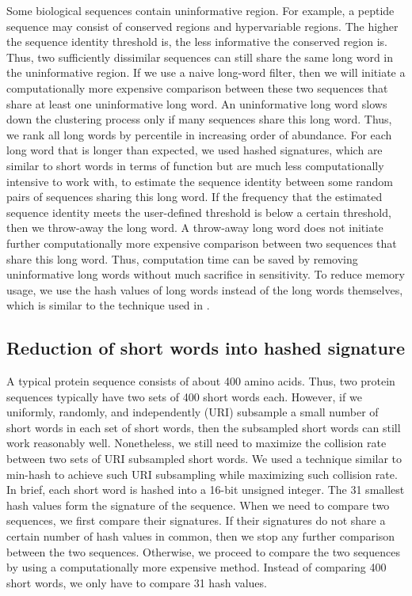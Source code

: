 \documentclass[11pt,letterpaper]{article}
\begin{document}
Some biological sequences contain uninformative region.
For example, a peptide sequence may consist of conserved regions and hypervariable regions.
The higher the sequence identity threshold is, the less informative the conserved region is.
Thus, two sufficiently dissimilar sequences can still share the same long word in the uninformative region.
If we use a naive long-word filter, then we will initiate a computationally more expensive comparison between these two sequences that share at least one uninformative long word.
An uninformative long word slows down the clustering process only if many sequences share this long word.
Thus, we rank all long words by percentile in increasing order of abundance.
For each long word that is longer than expected, we used hashed signatures, which are similar to short words in terms of function but are much less computationally intensive to work with, to estimate the sequence identity between some random pairs of sequences sharing this long word.
If the frequency that the estimated sequence identity meets the user-defined threshold is below a certain threshold,
then we throw-away the long word.
A throw-away long word does not initiate further computationally more expensive comparison between two sequences that share this long word.
Thus, computation time can be saved by removing uninformative long words without much sacrifice in sensitivity.
To reduce memory usage, we use the hash values of long words instead of the long words themselves, which is similar to the technique used in \citet{steinegger2017Linclust}.

\subsection{Reduction of short words into hashed signature}

A typical protein sequence consists of about 400 amino acids.
Thus, two protein sequences typically have two sets of 400 short words each.
However, if we uniformly, randomly, and independently (URI) subsample a small number of short words in each set of short words, then the subsampled short words can still work reasonably well. 
Nonetheless, we still need to maximize the collision rate between two sets of URI subsampled short words.
We used a technique similar to min-hash to achieve such URI subsampling while maximizing such collision rate.
In brief, each short word is hashed into a 16-bit unsigned integer.
The 31 smallest hash values form the signature of the sequence.
When we need to compare two sequences, we first compare their signatures.
If their signatures do not share a certain number of hash values in common, then we stop any further comparison between the two sequences. 
Otherwise, we proceed to compare the two sequences by using a computationally more expensive method.
Instead of comparing 400 short words, we only have to compare 31 hash values.
\end{document}
